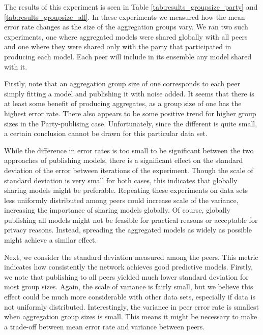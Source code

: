 The results of this experiment is seen in Table \ref{tab:results_groupsize_party} and \ref{tab:results_groupsize_all}. In these experiments we measured how the mean error rate changes as the size of the aggregation groups vary. We ran two such experiments, one where aggregated models were shared globally with all peers and one where they were shared only with the party that participated in producing each model. Each peer will include in its ensemble any model shared with it.

Firstly, note that an aggregation group size of one corresponds to each peer simply fitting a model and publishing it with noise added. It seems that there is at least some benefit of producing aggregates, as a group size of one has the highest error rate. There also appears to be some positive trend for higher group sizes in the Party-publising case. Unfortunately, since the different is quite small, a certain conclusion cannot be drawn for this particular data set.

While the difference in error rates is too small to be significant between the two approaches of publishing models, there is a significant effect on the standard deviation of the error between iterations of the experiment. Though the scale of standard deviation is very small for both cases, this indicates that globally sharing models might be preferable. Repeating these experiments on data sets less uniformly distributed among peers could increase scale of the variance, increasing the importance of sharing models globally. Of course, globally publishing all models might not be feasible for practical reasons or acceptable for privacy reasons. Instead, spreading the aggregated models as widely as possible might achieve a similar effect.

Next, we consider the standard deviation measured among the peers. This metric indicates how consistently the network achieves good predictive models. Firstly, we note that publishing to all peers yielded much lower standard deviation for most group sizes. Again, the scale of variance is fairly small, but we believe this effect could be much more considerable with other data sets, especially if data is not uniformly distributed. Interestingly, the variance in peer error rate is smallest when aggregation group sizes is small. This means it might be necessary to make a trade-off between mean error rate and variance between peers.

